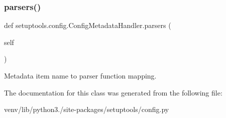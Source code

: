 \subsubsection{\texorpdfstring{parsers()}{parsers()}}
{\footnotesize\ttfamily def setuptools.\+config.\+Config\+Metadata\+Handler.\+parsers (\begin{DoxyParamCaption}\item[{}]{self }\end{DoxyParamCaption})}

\begin{DoxyVerb}Metadata item name to parser function mapping.\end{DoxyVerb}
 

The documentation for this class was generated from the following file\+:\begin{DoxyCompactItemize}
\item 
venv/lib/python3./site-\/packages/setuptools/config.\+py\end{DoxyCompactItemize}
